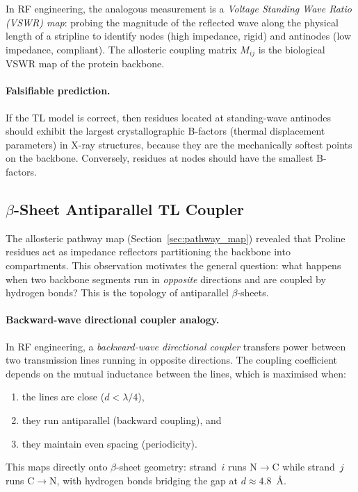 In RF engineering, the analogous measurement is a \emph{Voltage
Standing Wave Ratio (VSWR) map}: probing the magnitude of the
reflected wave along the physical length of a stripline to identify
nodes (high impedance, rigid) and antinodes (low impedance,
compliant).  The allosteric coupling matrix $M_{ij}$ is the
biological VSWR map of the protein backbone.

\paragraph{Falsifiable prediction.}
If the TL model is correct, then residues located at standing-wave
antinodes should exhibit the largest crystallographic B-factors
(thermal displacement parameters) in X-ray structures, because
they are the mechanically softest points on the backbone.
Conversely, residues at nodes should have the smallest B-factors.

\subsection{$\beta$-Sheet Antiparallel TL Coupler}
\label{sec:beta_sheet}

The allosteric pathway map (Section~\ref{sec:pathway_map}) revealed that
Proline residues act as impedance reflectors partitioning the backbone
into compartments.  This observation motivates the general question:
what happens when two backbone segments run in {\em opposite}
directions and are coupled by hydrogen bonds?  This is the topology
of antiparallel $\beta$-sheets.

\paragraph{Backward-wave directional coupler analogy.}
In RF engineering, a \emph{backward-wave directional coupler}
transfers power between two transmission lines running in opposite
directions.  The coupling coefficient depends on the mutual
inductance between the lines, which is maximised when:
\begin{enumerate}
    \item the lines are close ($d < \lambda/4$),
    \item they run antiparallel (backward coupling), and
    \item they maintain even spacing (periodicity).
\end{enumerate}
This maps directly onto $\beta$-sheet geometry: strand~$i$ runs
N$\to$C while strand~$j$ runs C$\to$N, with hydrogen bonds
bridging the gap at $d \approx 4.8$~\AA.

